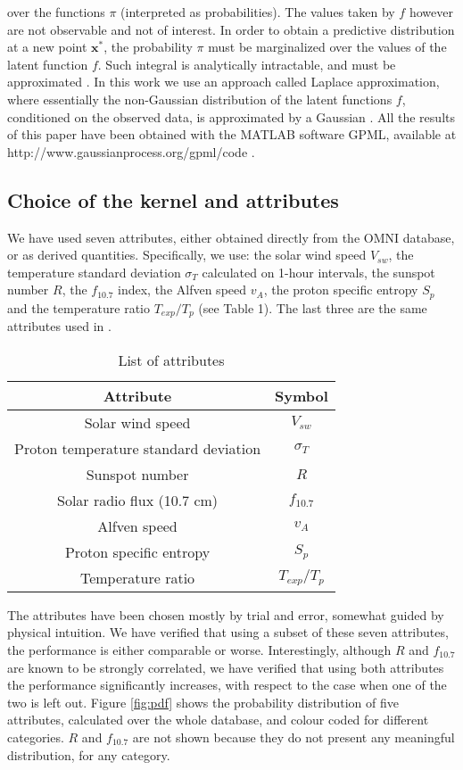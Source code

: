 \documentclass[draft,jgrga]{agutex}
\begin{document}
\begin{article}
over the functions $\pi$ (interpreted as probabilities). The values taken by $f$ however are not observable and not of interest. In order to obtain a predictive distribution at a new point $\mathbf{x}^*$, the probability $\pi$ must be marginalized over the values of the latent function $f$. Such integral is analytically intractable, and must be approximated \citep{williams98}.
In this work we use an approach called Laplace approximation, where essentially the non-Gaussian distribution of the latent functions $f$, conditioned on the observed data, is approximated by a Gaussian \citep{bishop2007}.
All the results of this paper have been obtained with the MATLAB software GPML, available at http://www.gaussianprocess.org/gpml/code \citep{rasmussen10}.


\subsection{Choice of the kernel and attributes}\label{attributes}
We have used seven attributes, either obtained directly from the OMNI database, or as derived quantities. Specifically, we use: the solar wind speed $V_{sw}$, the temperature standard deviation $\sigma_T$ {calculated on 1-hour intervals}, the sunspot number $R$, the $f_{10.7}$ index, the Alfven speed $v_A$, the proton specific entropy $S_p$ and the temperature ratio $T_{exp}/T_p$ (see Table 1). The last three are the same attributes used in \citet{xu2015}. 

\begin{table}[!ht]
 \caption{List of attributes}\label{table:attributes}
 \centering
 \begin{tabular}{cc}
  \hline
  Attribute & Symbol\\
  \hline
  Solar wind speed & $V_{sw}$\\ 
  Proton temperature standard deviation & $\sigma_{T}$\\
  Sunspot number & $R$\\
  Solar radio flux (10.7 cm) & $f_{10.7}$\\
  Alfven speed & $v_{A}$\\
  Proton specific entropy & $S_p$\\
  Temperature ratio & $T_{exp}/T_{p}$\\
  \hline
  
 \end{tabular}

\end{table}

The attributes have been chosen mostly by trial and error, somewhat guided by physical intuition.
We have verified that using a subset of these seven attributes, the performance is either comparable or worse.
Interestingly, although $R$ and $f_{10.7}$ are known to be strongly correlated, we have verified that using both attributes the performance significantly increases, with respect to the case when one of the two is left out.
{Figure \ref{fig:pdf} shows the probability distribution of five attributes, calculated over the whole database, and colour coded for different categories. $R$ and $f_{10.7}$ are not shown because they do not present any meaningful distribution, for any category.}\\



\end{article}
\end{document}
